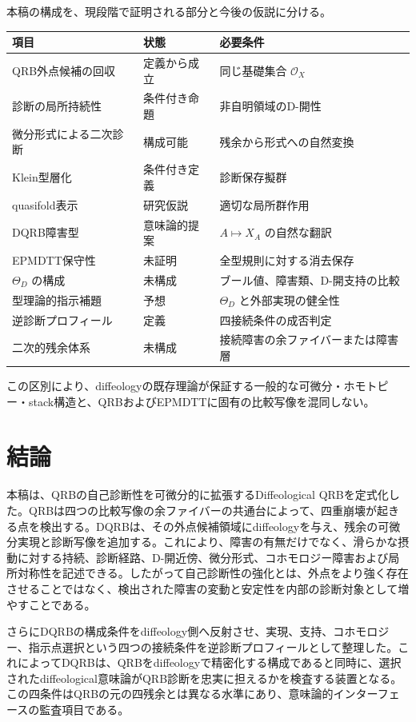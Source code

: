 \documentclass[a4paper,11pt]{ltjsarticle}
\theoremstyle{definition}
\theoremstyle{plain}
\begin{document}
本稿の構成を、現段階で証明される部分と今後の仮説に分ける。

\begin{center}
\begin{tabular}{p{} p{} p{}}
\toprule
項目 & 状態 & 必要条件 \\
\midrule
QRB外点候補の回収 & 定義から成立 & 同じ基礎集合 $\mathcal O_X$ \\
診断の局所持続性 & 条件付き命題 & 非自明領域のD-開性 \\
微分形式による二次診断 & 構成可能 & 残余から形式への自然変換 \\
Klein型層化 & 条件付き定義 & 診断保存擬群 \\
quasifold表示 & 研究仮説 & 適切な局所群作用 \\
DQRB障害型 & 意味論的提案 & $A\mapsto X_A$ の自然な翻訳 \\
EPMDTT保守性 & 未証明 & 全型規則に対する消去保存 \\
$\Theta_D$ の構成 & 未構成 & ブール値、障害類、D-開支持の比較 \\
型理論的指示補題 & 予想 & $\Theta_D$ と外部実現の健全性 \\
逆診断プロフィール & 定義 & 四接続条件の成否判定 \\
二次的残余体系 & 未構成 & 接続障害の余ファイバーまたは障害層 \\
\bottomrule
\end{tabular}
\end{center}

この区別により、diffeologyの既存理論が保証する一般的な可微分・ホモトピー・stack構造と、QRBおよびEPMDTTに固有の比較写像を混同しない。

\section{結論}

本稿は、QRBの自己診断性を可微分的に拡張するDiffeological QRBを定式化した。QRBは四つの比較写像の余ファイバーの共通台によって、四重崩壊が起きる点を検出する。DQRBは、その外点候補領域にdiffeologyを与え、残余の可微分実現と診断写像を追加する。これにより、障害の有無だけでなく、滑らかな摂動に対する持続、診断経路、D-開近傍、微分形式、コホモロジー障害および局所対称性を記述できる。したがって自己診断性の強化とは、外点をより強く存在させることではなく、検出された障害の変動と安定性を内部の診断対象として増やすことである。

さらにDQRBの構成条件をdiffeology側へ反射させ、実現、支持、コホモロジー、指示点選択という四つの接続条件を逆診断プロフィールとして整理した。これによってDQRBは、QRBをdiffeologyで精密化する構成であると同時に、選択されたdiffeological意味論がQRB診断を忠実に担えるかを検査する装置となる。この四条件はQRBの元の四残余とは異なる水準にあり、意味論的インターフェースの監査項目である。
\end{document}
